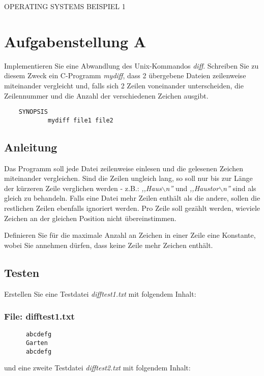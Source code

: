 \documentclass{article}
\begin{document}
\begin{center}
\begin{Large}
OPERATING SYSTEMS BEISPIEL 1
\end{Large}
\end{center}

\section*{Aufgabenstellung A}
Implementieren Sie eine Abwandlung des Unix-Kommandos \emph{diff}.
Schreiben Sie zu diesem Zweck ein C-Programm
\emph{mydiff}, dass 2 übergebene Dateien zeilenweise
miteinander vergleicht und, falls sich 2 Zeilen voneinander
unterscheiden, die Zeilennummer und die Anzahl der
verschiedenen Zeichen ausgibt.

\begin{verbatim}
	SYNOPSIS
      		mydiff file1 file2
\end{verbatim}


\subsection*{Anleitung}
      Das Programm soll jede Datei zeilenweise einlesen und die
      gelesenen Zeichen miteinander vergleichen. Sind die Zeilen
      ungleich lang, so soll nur bis zur Länge der kürzeren Zeile
      verglichen werden - z.B.: \emph{,,Haus$\backslash$n''} und \emph{,,Haustor$\backslash$n''}
      sind als gleich zu behandeln. Falls eine Datei mehr Zeilen enthält
      als die andere, sollen die restlichen Zeilen ebenfalls ignoriert
      werden. Pro Zeile soll gezählt werden, wieviele Zeichen an der
      gleichen Position nicht übereinstimmen.


      Definieren Sie für die maximale Anzahl an Zeichen in einer
      Zeile eine Konstante, wobei Sie annehmen dürfen, dass keine
      Zeile mehr Zeichen enthält.

\subsection*{Testen}
Erstellen Sie eine Testdatei \emph{difftest1.txt} mit folgendem Inhalt:
\subsubsection*{File: difftest1.txt}
\begin{verbatim}
      abcdefg
      Garten
      abcdefg
\end{verbatim}
      und eine zweite Testdatei \emph{difftest2.txt} mit
      folgendem Inhalt:
\end{document}
